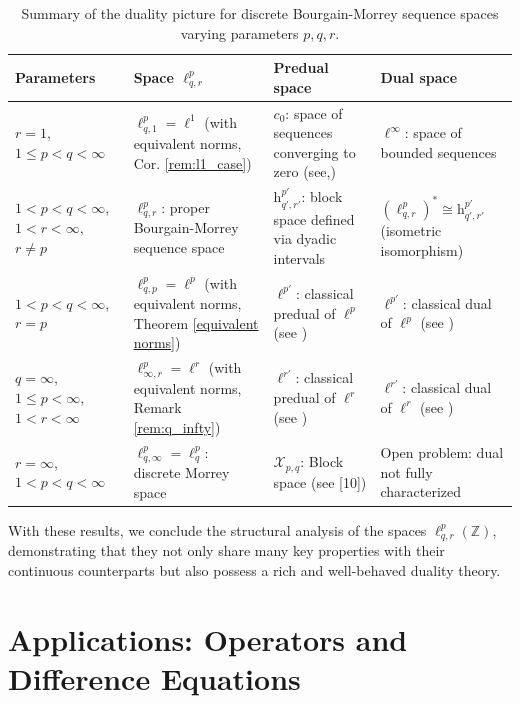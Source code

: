 \documentclass[preprint,12pt]{elsarticle}
\begin{document}
\begin{table}[H]
\centering
\renewcommand{\arraystretch}{1.5}
\begin{tabular}{|p{3cm}|p{3.5cm}|p{3.5cm}|p{3.5cm}|}
\hline
\textbf{Parameters} & \textbf{Space $\ell_{q,r}^p$} & \textbf{Predual space} & \textbf{Dual space} \\
\hline
$r=1$, $1\le p< q<\infty$ & $\ell_{q,1}^p = \ell^1$ (with equivalent norms, Cor. \ref{rem:l1_case}) & $c_0$: space of sequences converging to zero (see,\cite{albiac2006topics}) & $\ell^\infty$: space of bounded sequences \\
\hline
$1<p< q<\infty$, $1<r<\infty$, $r\neq p$ & $\ell_{q,r}^p$: proper Bourgain-Morrey sequence space & $\mathrm{h}^{p'}_{q',r'}$: block space defined via dyadic intervals & $(\ell_{q,r}^p)^* \cong \mathrm{h}^{p'}_{q',r'}$ (isometric isomorphism) \\
\hline
$1<p< q<\infty$, $r= p$ & $\ell_{q,p}^p = \ell^{p}$ (with equivalent norms, Theorem \ref{equivalent norms}) & $\ell^{p'}$: classical predual of $\ell^p$ (see \cite{folland1999real}) & $\ell^{p'}$: classical dual of $\ell^p$ (see \cite{folland1999real})\\
\hline
$q = \infty$, $1 \leq p < \infty$, $1 < r < \infty$ & $\ell_{\infty,r}^p = \ell^r$ (with equivalent norms, Remark \ref{rem:q_infty}) & $\ell^{r'}$: classical predual of $\ell^r$ (see \cite{folland1999real}) &  $\ell^{r'}$: classical dual of $\ell^r$ (see \cite{folland1999real})\\
\hline
$r=\infty$, $1<p< q<\infty$ & $\ell_{q,\infty}^p=\ell^{p}_{q}$: discrete Morrey space  & $\mathcal{X}_{p,q}$: Block space (see [10]) & Open problem: dual not fully characterized \\
\hline
\end{tabular}
\caption{Summary of the duality picture for discrete Bourgain-Morrey sequence spaces varying parameters $p,q,r$.}
\end{table}
With these results, we conclude the structural analysis of the spaces \(\ell^{p}_{q,r}(\mathbb{Z})\), demonstrating that they not only share many key properties with their continuous counterparts but also possess a rich and well-behaved duality theory.

\section{Applications: Operators and Difference Equations}
\label{sec:applications}
\end{document}

